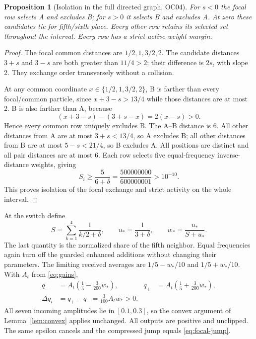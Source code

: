 \documentclass[11pt,a4paper]{article}
\newtheorem{proposition}[theorem]{Proposition}
\theoremstyle{remark}\newtheorem{remark}[theorem]{Remark}
\numberwithin{equation}{section}
\begin{document}
\begin{proposition}[Isolation in the full directed graph, OC04]\label{prop:isolation}
For $s<0$ the focal row selects A and excludes B; for $s>0$ it selects B
and excludes A. At zero these candidates tie for fifth/sixth place.
Every other row retains its selected set throughout the interval.
Every row has a strict active-weight margin.
\end{proposition}
\begin{proof}
The focal common distances are $1/2,1,3/2,2$. The candidate distances
$3+s$ and $3-s$ are both greater than $11/4>2$; their difference is $2s$,
with slope 2. They exchange order transversely without a collision.

At any common coordinate $x\in\{1/2,1,3/2,2\}$, B is farther than every
focal/common particle, since $x+3-s>13/4$ while those distances are at most
2. B is also farther than A, because
\[
(x+3-s)-(3+s-x)=2(x-s)>0.
\]
Hence every common row uniquely excludes B. The A--B distance is 6.
All other distances from A are at most $3+s<13/4$, so A excludes B;
all other distances from B are at most $5-s<21/4$, so B excludes A.
All positions are distinct and all pair distances are at most 6.
Each row selects five equal-frequency inverse-distance weights, giving
\begin{equation}
S_i\ge\frac5{6+\delta}
=\frac{500000000}{600000001}>10^{-10}.\label{eq:seven-guard}
\end{equation}
This proves isolation of the focal exchange and strict activity on the
whole interval.
\end{proof}

At the switch define
\begin{equation}
S=\sum_{k=1}^4\frac1{k/2+\delta},\qquad
u_*=\frac1{3+\delta},\qquad w_*=\frac{u_*}{S+u_*}.
\label{eq:fifth-share}
\end{equation}
The last quantity is the normalized share of the fifth neighbor. Equal
frequencies again turn off the guarded enhanced additions without changing
their parameters. The limiting received averages are
$1/5-w_*/10$ and $1/5+w_*/10$. With $A_t$ from \eqref{eq:gains},
\begin{align}
q_-&=A_t\left(\frac15-\frac{3}{200}w_*\right),&
q_+&=A_t\left(\frac15+\frac{3}{200}w_*\right),\label{eq:focal-limits}\\
\Delta q_i&=q_+-q_-=\frac3{100}A_tw_*>0.\label{eq:focal-jump}
\end{align}
All seven incoming amplitudes lie in $[0.1,0.3]$, so the convex argument
of Lemma~\ref{lem:convex} applies unchanged. All outputs are positive and
unclipped. The same epsilon cancels and the compressed jump equals
\eqref{eq:focal-jump}.
\end{document}
